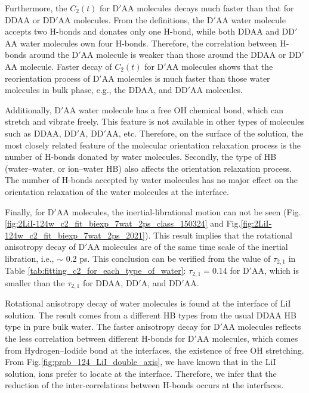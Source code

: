 Furthermore, the $C_2(t)$ for D$'$AA molecules decays much faster than that for DDAA or DD$'$AA molecules.
From the definitions, the D$'$AA water molecule accepts two H-bonds and donates only one H-bond, 
while both DDAA and DD$'$AA water molecules own four H-bonds.
Therefore, the correlation between H-bonds around the D$'$AA molecule is weaker than those around the DDAA or DD$'$AA molecule. 
Faster decay of $C_2(t)$ for D$'$AA molecules shows that the reorientation process of D$'$AA
molecules is much faster than those water molecules in bulk phase, e.g., the DDAA, and DD$'$AA molecules.

Additionally, D$'$AA water molecule has a free OH chemical bond, which can stretch and vibrate freely. 
This feature is not available in other types of molecules such as DDAA, DD$'$A, DD$'$AA, etc. 
Therefore, on the surface of the solution, the most closely related feature of the molecular orientation relaxation process is 
the number of H-bonds donated by water molecules. Secondly, the type of HB (water--water, or ion--water HB) 
also affects the orientation relaxation process. The number of H-bonds accepted by water molecules has no major effect on the orientation relaxation 
of the water molecules at the interface.

Finally, for D$'$AA molecules, the inertial-librational motion can not be seen (Fig.\thinspace\ref{fig:2LiI-124w_c2_fit_biexp_7wat_2ps_class_150324} 
and Fig.\thinspace\ref{fig:2LiI-124w_c2_fit_biexp_7wat_2ps_2021}). 
This result implies that the rotational anisotropy decay of D$'$AA molecules
are of the same time scale of the inertial libration, i.e., $\sim$ 0.2 ps. 
This conclusion can be verified from the value of $\tau_{2,1}$ in Table \ref{tab:fitting_c2_for_each_type_of_water}: $\tau_{2,1}=0.14$ for D$'$AA, 
which is smaller than the $\tau_{2,1}$ for DDAA, DD$'$A, and DD$'$AA.

Rotational anisotropy decay of water molecules is found at the interface of LiI solution. 
The result comes from a different HB types from the usual DDAA HB type in pure bulk water.
The faster anisotropy decay for D$'$AA molecules reflects the less correlation between different H-bonds for D$'$AA molecules, 
which comes from Hydrogen--Iodide bond at the interfaces, the existence of free OH stretching.
From Fig.\space\ref{fig:prob_124_LiI_double_axis}, we have known that in the LiI solution, 
\I ions prefer to locate at the interface.  
Therefore, we infer that the reduction of the inter-correlations between H-bonds occurs at the interfaces. 

